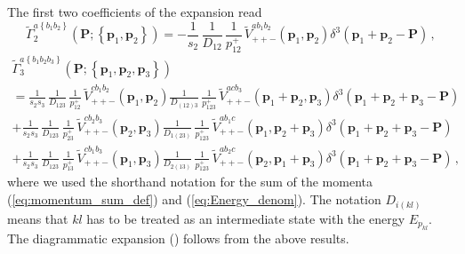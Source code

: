 \documentclass[english,american]{article}
\begin{document}
The first two coefficients of the expansion read
\begin{equation}
\tilde{\Gamma}_{2}^{a\left\{ b_{1}b_{2}\right\} }\left(\mathbf{P};\left\{ \mathbf{p}_{1},\mathbf{p}_{2}\right\} \right)=-\frac{1}{s_{2}}\,\frac{1}{D_{12}}\,\frac{1}{p_{12}^{+}}\,\tilde{V}_{++-}^{ab_{1}b_{2}}\left(\mathbf{p}_{1},\mathbf{p}_{2}\right)\delta^{3}\left(\mathbf{p}_{1}+\mathbf{p}_{2}-\mathbf{P}\right)\,,
\end{equation}
\begin{multline}
\tilde{\Gamma}_{3}^{a\left\{ b_{1}b_{2}b_{3}\right\} }\left(\mathbf{P};\left\{ \mathbf{p}_{1},\mathbf{p}_{2},\mathbf{p}_{3}\right\} \right)\\
=\frac{1}{s_{2}s_{3}}\,\frac{1}{D_{123}}\,\frac{1}{p_{12}^{+}}\,\tilde{V}_{++-}^{cb_{1}b_{2}}\left(\mathbf{p}_{1},\mathbf{p}_{2}\right)\frac{1}{D_{\left(12\right)3}}\,\frac{1}{p_{123}^{+}}\,\tilde{V}_{++-}^{acb_{3}}\left(\mathbf{p}_{1}+\mathbf{p}_{2},\mathbf{p}_{3}\right)\delta^{3}\left(\mathbf{p}_{1}+\mathbf{p}_{2}+\mathbf{p}_{3}-\mathbf{P}\right)\\
+\frac{1}{s_{2}s_{3}}\,\frac{1}{D_{123}}\,\frac{1}{p_{23}^{+}}\,\tilde{V}_{++-}^{cb_{2}b_{3}}\left(\mathbf{p}_{2},\mathbf{p}_{3}\right)\frac{1}{D_{1\left(23\right)}}\,\frac{1}{p_{123}^{+}}\,\tilde{V}_{++-}^{ab_{1}c}\left(\mathbf{p}_{1},\mathbf{p}_{2}+\mathbf{p}_{3}\right)\delta^{3}\left(\mathbf{p}_{1}+\mathbf{p}_{2}+\mathbf{p}_{3}-\mathbf{P}\right)\\
+\frac{1}{s_{2}s_{3}}\,\frac{1}{D_{123}}\,\frac{1}{p_{13}^{+}}\,\tilde{V}_{++-}^{cb_{1}b_{3}}\left(\mathbf{p}_{1},\mathbf{p}_{3}\right)\frac{1}{D_{2\left(13\right)}}\,\frac{1}{p_{123}^{+}}\,\tilde{V}_{++-}^{ab_{2}c}\left(\mathbf{p}_{2},\mathbf{p}_{1}+\mathbf{p}_{3}\right)\delta^{3}\left(\mathbf{p}_{1}+\mathbf{p}_{2}+\mathbf{p}_{3}-\mathbf{P}\right)\,,
\end{multline}
where we used the shorthand notation for the sum of the momenta (\ref{eq:momentum_sum_def})
and (\ref{eq:Energy_denom}). The notation $D_{i\left(kl\right)}$
means that $kl$ has to be treated as an intermediate state with the energy
$E_{p_{kl}}$. The diagrammatic expansion () follows  from the above results.
\end{document}
